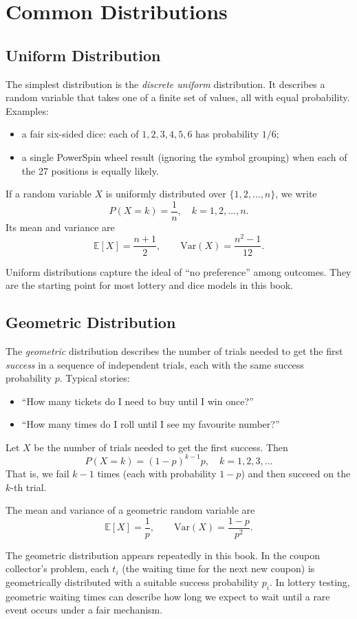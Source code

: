 \chapter{Common Distributions}

\section{Uniform Distribution}
The simplest distribution is the \emph{discrete uniform} distribution.  It
describes a random variable that takes one of a finite set of values, all with
equal probability.  Examples:
\begin{itemize}
  \item a fair six-sided dice: each of \(1,2,3,4,5,6\) has probability \(1/6\);
  \item a single PowerSpin wheel result (ignoring the symbol grouping) when each
        of the 27 positions is equally likely.
\end{itemize}

If a random variable \(X\) is uniformly distributed over
\(\{1,2,\dots,n\}\), we write
\[
  P(X = k) = \frac{1}{n}, \quad k = 1,2,\dots,n.
\]
Its mean and variance are
\[
  \mathbb{E}[X] = \frac{n+1}{2}, \qquad
  \mathrm{Var}(X) = \frac{n^2-1}{12}.
\]

Uniform distributions capture the ideal of ``no preference'' among outcomes.
They are the starting point for most lottery and dice models in this book.

\section{Geometric Distribution}
The \emph{geometric} distribution describes the number of trials needed to get
the first \emph{success} in a sequence of independent trials, each with the
same success probability \(p\).  Typical stories:
\begin{itemize}
  \item ``How many tickets do I need to buy until I win once?''
  \item ``How many times do I roll until I see my favourite number?''
\end{itemize}

Let \(X\) be the number of trials needed to get the first success.  Then
\[
  P(X = k) = (1-p)^{k-1}p, \quad k = 1,2,3,\dots
\]
That is, we fail \(k-1\) times (each with probability \(1-p\)) and then
succeed on the \(k\)-th trial.

The mean and variance of a geometric random variable are
\[
  \mathbb{E}[X] = \frac{1}{p}, \qquad
  \mathrm{Var}(X) = \frac{1-p}{p^2}.
\]

The geometric distribution appears repeatedly in this book.  In the coupon
collector's problem, each \(t_i\) (the waiting time for the next new coupon) is
geometrically distributed with a suitable success probability \(p_i\).  In
lottery testing, geometric waiting times can describe how long we expect to
wait until a rare event occurs under a fair mechanism.


